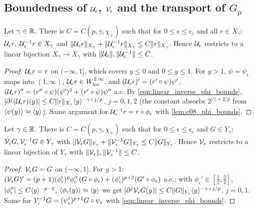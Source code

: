 \subsection{Boundedness of $\mathcal{U}_\epsilon$, $\mathcal{V}_\epsilon$ and the transport of $G_\mu$}

\begin{lemma}
  \label{lem:c08_U_bounded}
  Let $\gamma\in\mathbb{R}$. There is $C=C(p,\gamma,\chi_+)$ such that for $0\le\epsilon\le\epsilon_c$ and all $r\in X_\gamma$:
  $\mathcal{U}_\epsilon r,\ \mathcal{U}_\epsilon^{-1}r\in X_\gamma$ and $\|\mathcal{U}_\epsilon r\|_{X_\gamma}+\|\mathcal{U}_\epsilon^{-1}r\|_{X_\gamma}\le C\|r\|_{X_\gamma}$. Hence $\mathcal{U}_\epsilon$
  restricts to a linear bijection $X_\gamma\to X_\gamma$ with $\|\mathcal{U}_\epsilon\|,\|\mathcal{U}_\epsilon^{-1}\|\le C$.
\end{lemma}
\begin{proof}
  $\mathcal{U}_\epsilon r=r$ on $(-\infty,1]$, which covers $y\le0$ and $0\le y\le1$. For $y>1$, $\psi=\psi_\epsilon$ maps into
  $(1,\infty)$, $\mathcal{U}_\epsilon r\in W^{2,\infty}_{\rm loc}$, and $(\mathcal{U}_\epsilon r)'=(r'\circ\psi)\psi'$,
  $(\mathcal{U}_\epsilon r)''=(r''\circ\psi)(\psi')^2+(r'\circ\psi)\psi''$ a.e. By \eqref{eqn:linear_inverse_phi_bounds},
  $|\partial^j(\mathcal{U}_\epsilon r)(y)|\le C\|r\|_{X_\gamma}\langle y \rangle^{-\gamma+j/p}$, $j=0,1,2$ (the constant absorbs
  $2^{|\gamma|+2/p}$ from $\langle \psi(y) \rangle\approx\langle y \rangle$). Same argument for $\mathcal{U}_\epsilon^{-1}r=r\circ\phi_\epsilon$ with
  \cref{lem:c08_phi_bounds}.
\end{proof}

\begin{lemma}
  \label{lem:c08_V_bounded}
  Let $\gamma\in\mathbb{R}$. There is $C=C(p,\gamma,\chi_+)$ such that for $0\le\epsilon\le\epsilon_c$ and $G\in Y_\gamma$:
  $\mathcal{V}_\epsilon G,\mathcal{V}_\epsilon^{-1}G\in Y_\gamma$ with $\|\mathcal{V}_\epsilon G\|_{Y_\gamma}+\|\mathcal{V}_\epsilon^{-1}G\|_{Y_\gamma}\le C\|G\|_{Y_\gamma}$. Hence
  $\mathcal{V}_\epsilon$ restricts to a linear bijection of $Y_\gamma$ with $\|\mathcal{V}_\epsilon\|,\|\mathcal{V}_\epsilon^{-1}\|\le C$.
\end{lemma}
\begin{proof}
  $\mathcal{V}_\epsilon G=G$ on $(-\infty,1]$. For $y>1$:
  $(\mathcal{V}_\epsilon G)'=(p+1)(\phi_\epsilon')^p\phi_\epsilon''\,(G\circ\phi_\epsilon)+(\phi_\epsilon')^{p+2}(G'\circ\phi_\epsilon)$ a.e.; with
  $\phi_\epsilon'\in[\frac12,\frac32]$, $|\phi_\epsilon''|\le C\langle y \rangle^{-p-2}$, $\langle \phi_\epsilon(y) \rangle\approx\langle y \rangle$ we get
  $|\partial^j\mathcal{V}_\epsilon G(y)|\le C\|G\|_{Y_\gamma}\langle y \rangle^{-\gamma+j/p}$, $j=0,1$. Same for
  $\mathcal{V}_\epsilon^{-1}G=(\psi_\epsilon')^{p+1}G\circ\psi_\epsilon$ with \eqref{eqn:linear_inverse_phi_bounds}.
\end{proof}

